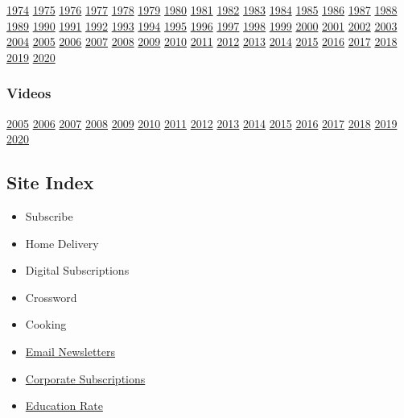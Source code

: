 \href{1974/}{1974} \href{1975/}{1975} \href{1976/}{1976}
\href{1977/}{1977} \href{1978/}{1978} \href{1979/}{1979}
\href{1980/}{1980} \href{1981/}{1981} \href{1982/}{1982}
\href{1983/}{1983} \href{1984/}{1984} \href{1985/}{1985}
\href{1986/}{1986} \href{1987/}{1987} \href{1988/}{1988}
\href{1989/}{1989} \href{1990/}{1990} \href{1991/}{1991}
\href{1992/}{1992} \href{1993/}{1993} \href{1994/}{1994}
\href{1995/}{1995} \href{1996/}{1996} \href{1997/}{1997}
\href{1998/}{1998} \href{1999/}{1999} \href{2000/}{2000}
\href{2001/}{2001} \href{2002/}{2002} \href{2003/}{2003}
\href{2004/}{2004} \href{2005/}{2005} \href{2006/}{2006}
\href{2007/}{2007} \href{2008/}{2008} \href{2009/}{2009}
\href{2010/}{2010} \href{2011/}{2011} \href{2012/}{2012}
\href{2013/}{2013} \href{2014/}{2014} \href{2015/}{2015}
\href{2016/}{2016} \href{2017/}{2017} \href{2018/}{2018}
\href{2019/}{2019} \href{2020/}{2020}

\hypertarget{videos}{%
\subsubsection{Videos}\label{videos}}

\href{video_2005/index.html}{2005} \href{video_2006/index.html}{2006}
\href{video_2007/index.html}{2007} \href{video_2008/index.html}{2008}
\href{video_2009/index.html}{2009} \href{video_2010/index.html}{2010}
\href{video_2011/index.html}{2011} \href{video_2012/index.html}{2012}
\href{video_2013/index.html}{2013} \href{video_2014/index.html}{2014}
\href{video_2015/index.html}{2015} \href{video_2016/index.html}{2016}
\href{video_2017/index.html}{2017} \href{video_2018/index.html}{2018}
\href{video_2019/index.html}{2019} \href{video_2020/index.html}{2020}

\hypertarget{site-index}{%
\subsection{Site Index}\label{site-index}}

\begin{itemize}
\tightlist
\item
  Subscribe
\item
  Home Delivery
\item
  Digital Subscriptions
\item
  Crossword
\item
  Cooking
\end{itemize}

\begin{itemize}
\tightlist
\item
  \href{http://www.nytimes.com/marketing/newsletters}{Email Newsletters}
\item
  \href{http://www.nytimes.com/corporateleftnav}{Corporate
  Subscriptions}
\item
  \href{http://www.nytimes.com/educationleftnav}{Education Rate}
\end{itemize}

